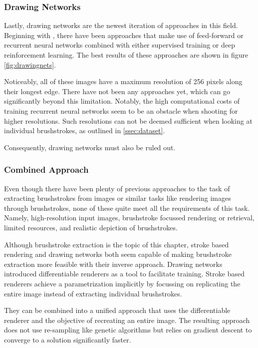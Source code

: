 \subsubsection{Drawing Networks}
Lastly, drawing networks are the newest iteration of approaches in this field.
Beginning with , there have been approaches that make use of feed-forward or recurrent neural networks combined with either supervised training or deep reinforcement learning.
The best results of these approaches are shown in figure \ref{fig:drawingnets}.

Noticeably, all of these images have a maximum resolution of 256 pixels along their longest edge.
There have not been any approaches yet, which can go significantly beyond this limitation.
Notably, the high computational costs of training recurrent neural networks seem to be an obstacle when shooting for higher resolutions.
Such resolutions can not be deemed sufficient when looking at individual brushstrokes, as outlined in \ref{ssec:dataset}.

Consequently, drawing networks must also be ruled out.

\subsubsection{Combined Approach}

Even though there have been plenty of previous approaches to the task of extracting brushstrokes from images or similar tasks like rendering images through brushstrokes, none of these quite meet all the requirements of this task.
Namely, high-resolution input images, brushstroke focussed rendering or retrieval, limited resources, and realistic depiction of brushstrokes.

Although brushstroke extraction is the topic of this chapter, stroke based rendering and drawing networks both seem capable of making brushstroke extraction more feasible with their inverse approach.
Drawing networks introduced differentiable renderers as a tool to facilitate training.
Stroke based renderers achieve a parametrization implicitly by focussing on replicating the entire image instead of extracting individual brushstrokes.

They can be combined into a unified approach that uses the differentiable renderer and the objective of recreating an entire image.
The resulting approach does not use re-sampling like genetic algorithms but relies on gradient descent to converge to a solution significantly faster.


